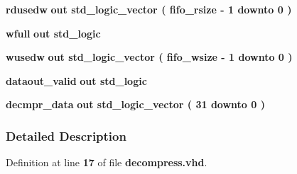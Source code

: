 \begin{DoxyCompactItemize}
\item 
{\bf rdusedw}  {\bfseries {\bfseries \textcolor{keywordflow}{out}\textcolor{vhdlchar}{ }}} {\bfseries \textcolor{comment}{std\+\_\+logic\+\_\+vector}\textcolor{vhdlchar}{ }\textcolor{vhdlchar}{(}\textcolor{vhdlchar}{ }\textcolor{vhdlchar}{ }\textcolor{vhdlchar}{ }\textcolor{vhdlchar}{ }{\bfseries {\bf fifo\+\_\+rsize}} \textcolor{vhdlchar}{-\/}\textcolor{vhdlchar}{ } \textcolor{vhdldigit}{1} \textcolor{vhdlchar}{ }\textcolor{keywordflow}{downto}\textcolor{vhdlchar}{ }\textcolor{vhdlchar}{ } \textcolor{vhdldigit}{0} \textcolor{vhdlchar}{ }\textcolor{vhdlchar}{)}\textcolor{vhdlchar}{ }} 
\item 
{\bf wfull}  {\bfseries {\bfseries \textcolor{keywordflow}{out}\textcolor{vhdlchar}{ }}} {\bfseries \textcolor{comment}{std\+\_\+logic}\textcolor{vhdlchar}{ }} 
\item 
{\bf wusedw}  {\bfseries {\bfseries \textcolor{keywordflow}{out}\textcolor{vhdlchar}{ }}} {\bfseries \textcolor{comment}{std\+\_\+logic\+\_\+vector}\textcolor{vhdlchar}{ }\textcolor{vhdlchar}{(}\textcolor{vhdlchar}{ }\textcolor{vhdlchar}{ }\textcolor{vhdlchar}{ }\textcolor{vhdlchar}{ }{\bfseries {\bf fifo\+\_\+wsize}} \textcolor{vhdlchar}{-\/}\textcolor{vhdlchar}{ } \textcolor{vhdldigit}{1} \textcolor{vhdlchar}{ }\textcolor{keywordflow}{downto}\textcolor{vhdlchar}{ }\textcolor{vhdlchar}{ } \textcolor{vhdldigit}{0} \textcolor{vhdlchar}{ }\textcolor{vhdlchar}{)}\textcolor{vhdlchar}{ }} 
\item 
{\bf dataout\+\_\+valid}  {\bfseries {\bfseries \textcolor{keywordflow}{out}\textcolor{vhdlchar}{ }}} {\bfseries \textcolor{comment}{std\+\_\+logic}\textcolor{vhdlchar}{ }} 
\item 
{\bf decmpr\+\_\+data}  {\bfseries {\bfseries \textcolor{keywordflow}{out}\textcolor{vhdlchar}{ }}} {\bfseries \textcolor{comment}{std\+\_\+logic\+\_\+vector}\textcolor{vhdlchar}{ }\textcolor{vhdlchar}{(}\textcolor{vhdlchar}{ }\textcolor{vhdlchar}{ } \textcolor{vhdldigit}{31} \textcolor{vhdlchar}{ }\textcolor{keywordflow}{downto}\textcolor{vhdlchar}{ }\textcolor{vhdlchar}{ } \textcolor{vhdldigit}{0} \textcolor{vhdlchar}{ }\textcolor{vhdlchar}{)}\textcolor{vhdlchar}{ }} 
\end{DoxyCompactItemize}


\subsubsection{Detailed Description}


Definition at line {\bf 17} of file {\bf decompress.\+vhd}.



